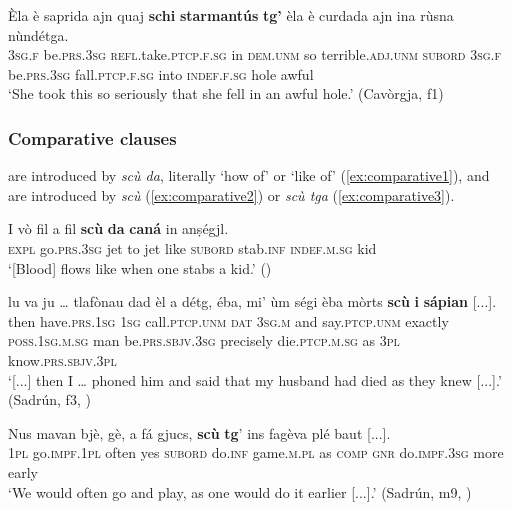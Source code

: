 \ea
\label{ex:consec4}
\gll  Èla è saprida ajn quaj \textbf{schi} \textbf{starmantús} \textbf{tg'} èla è curdada ajn ina rùsna nùndétga.\\
\textsc{3sg.f} be.\textsc{prs.3sg} \textsc{refl.}take.\textsc{ptcp.f.sg} in \textsc{dem.unm} so terrible.\textsc{adj.unm} \textsc{subord} \textsc{3sg.f} be.\textsc{prs.3sg} fall.\textsc{ptcp.f.sg} into \textsc{indef.f.sg} hole awful\\
\glt `She took this so seriously that she fell in an awful hole.' (Cavòrgja, f1)
\z

\subsubsection{Comparative clauses}\label{sec:6.2.2.7}
 are introduced by \textit{scù da}, literally `how of' or `like of' (\ref{ex:comparative1}), and  are introduced by \textit{scù} (\ref{ex:comparative2}) or \textit{scù tga} (\ref{ex:comparative3}).


\ea
\label{ex:comparative1}
\gll  I vò fil a fil \textbf{scù} \textbf{da} \textbf{caná} in anṣégjl.\\
    \textsc{expl} go.\textsc{prs.3sg} jet to jet like \textsc{subord} stab.\textsc{inf} \textsc{indef.m.sg} kid \\
\glt `[Blood] flows like when one stabs a kid.' ()
\z

\ea
\label{ex:comparative2}
\gll  [...] lu va ju … tlafònau dad èl a détg, éba, mi' ùm ségi èba mòrts \textbf{scù} \textbf{i} \textbf{sápian} [...].\\
{} then have.\textsc{prs.1sg} \textsc{1sg} {} call.\textsc{ptcp.unm} \textsc{dat} \textsc{3sg.m} and say.\textsc{ptcp.unm} exactly \textsc{poss.1sg.m.sg} man be.\textsc{prs.sbjv.3sg} precisely die.\textsc{ptcp.m.sg} as \textsc{3pl} know.\textsc{prs.sbjv.3pl}\\ 
\glt `[...] then I … phoned him and said that my husband had died as they knew [...].' (Sadrún, f3, )
\z

\ea
\label{ex:comparative3}
\gll Nus mavan bjè, gè, a fá gjucs, \textbf{scù} \textbf{tg}’ ins fagèva plé baut [...].   \\
\textsc{1pl} go.\textsc{impf.1pl} often yes \textsc{subord} do.\textsc{inf} game.\textsc{m.pl} as \textsc{comp} \textsc{gnr} do.\textsc{impf.3sg} more early \\
\glt `We would often go and play, as one would do it earlier [...].' (Sadrún, m9, )
\z

